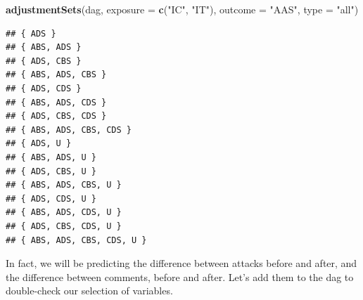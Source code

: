 \documentclass[10pt,dvipsnames,enabledeprecatedfontcommands]{scrartcl}
\newenvironment{Shaded}{\begin{snugshade}}{\end{snugshade}}
\newcommand{\KeywordTok}[1]{\textcolor[rgb]{0.13,0.29,0.53}{\textbf{#1}}}
\newcommand{\DataTypeTok}[1]{\textcolor[rgb]{0.13,0.29,0.53}{#1}}
\newcommand{\StringTok}[1]{\textcolor[rgb]{0.31,0.60,0.02}{#1}}
\newcommand{\NormalTok}[1]{#1}
\begin{document}
\vspace{1mm} \footnotesize

\begin{Shaded}
\begin{Highlighting}[]
\KeywordTok{adjustmentSets}\NormalTok{(dag, }\DataTypeTok{exposure =} \KeywordTok{c}\NormalTok{(}\StringTok{"IC"}\NormalTok{, }\StringTok{"IT"}\NormalTok{), }\DataTypeTok{outcome =} \StringTok{"AAS"}\NormalTok{, }\DataTypeTok{type =} \StringTok{"all"}\NormalTok{)}
\end{Highlighting}
\end{Shaded}

\begin{verbatim}
## { ADS }
## { ABS, ADS }
## { ADS, CBS }
## { ABS, ADS, CBS }
## { ADS, CDS }
## { ABS, ADS, CDS }
## { ADS, CBS, CDS }
## { ABS, ADS, CBS, CDS }
## { ADS, U }
## { ABS, ADS, U }
## { ADS, CBS, U }
## { ABS, ADS, CBS, U }
## { ADS, CDS, U }
## { ABS, ADS, CDS, U }
## { ADS, CBS, CDS, U }
## { ABS, ADS, CBS, CDS, U }
\end{verbatim}

\normalsize

In fact, we will be predicting the difference between attacks before and
after, and the difference between comments, before and after. Let's add
them to the dag to double-check our selection of variables.
\end{document}
